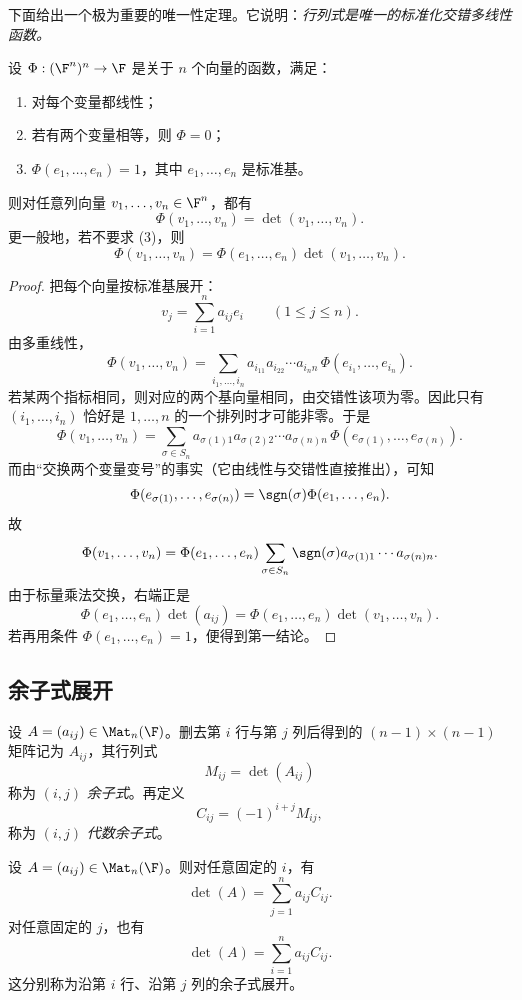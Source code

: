 下面给出一个极为重要的唯一性定理。它说明：\emph{行列式是唯一的标准化交错多线性函数。}

\begin{theorem}[行列式的刻画]
设 $\Phi:(\F^n)^n\to\F$ 是关于 $n$ 个向量的函数，满足：
\begin{enumerate}[label=(\arabic*)]
  \item 对每个变量都线性；
  \item 若有两个变量相等，则 $\Phi=0$；
  \item $\Phi(e_1,\dots,e_n)=1$，其中 $e_1,\dots,e_n$ 是标准基。
\end{enumerate}
则对任意列向量 $v_1,\dots,v_n\in\F^n$，都有
\[
\Phi(v_1,\dots,v_n)=\det(v_1,\dots,v_n).
\]
更一般地，若不要求 (3)，则
\[
\Phi(v_1,\dots,v_n)=\Phi(e_1,\dots,e_n)\det(v_1,\dots,v_n).
\]
\end{theorem}

\begin{proof}
把每个向量按标准基展开：
\[
v_j=\sum_{i=1}^n a_{ij}e_i\qquad (1\le j\le n).
\]
由多重线性，
\[
\Phi(v_1,\dots,v_n)=\sum_{i_1,\dots,i_n}a_{i_11}a_{i_22}\cdots a_{i_nn}\,\Phi(e_{i_1},\dots,e_{i_n}).
\]
若某两个指标相同，则对应的两个基向量相同，由交错性该项为零。因此只有 $(i_1,\dots,i_n)$ 恰好是 $1,\dots,n$ 的一个排列时才可能非零。于是
\[
\Phi(v_1,\dots,v_n)=\sum_{\sigma\in S_n}a_{\sigma(1)1}a_{\sigma(2)2}\cdots a_{\sigma(n)n}\,\Phi(e_{\sigma(1)},\dots,e_{\sigma(n)}).
\]
而由“交换两个变量变号”的事实（它由线性与交错性直接推出），可知
\[
\Phi(e_{\sigma(1)},\dots,e_{\sigma(n)})=\sgn(\sigma)\Phi(e_1,\dots,e_n).
\]
故
\[
\Phi(v_1,\dots,v_n)=\Phi(e_1,\dots,e_n)\sum_{\sigma\in S_n}\sgn(\sigma)a_{\sigma(1)1}\cdots a_{\sigma(n)n}.
\]
由于标量乘法交换，右端正是
\[
\Phi(e_1,\dots,e_n)\det(a_{ij})=
\Phi(e_1,\dots,e_n)\det(v_1,\dots,v_n).
\]
若再用条件 $\Phi(e_1,\dots,e_n)=1$，便得到第一结论。
\end{proof}

\subsection{余子式展开}

\begin{definition}
设 $A=(a_{ij})\in\Mat_n(\F)$。删去第 $i$ 行与第 $j$ 列后得到的 $(n-1)\times(n-1)$ 矩阵记为 $A_{ij}$，其行列式
\[
M_{ij}=\det(A_{ij})
\]
称为 $(i,j)$ \emph{余子式}。再定义
\[
C_{ij}=(-1)^{i+j}M_{ij},
\]
称为 $(i,j)$ \emph{代数余子式}。
\end{definition}

\begin{theorem}[按行按列展开]
设 $A=(a_{ij})\in\Mat_n(\F)$。则对任意固定的 $i$，有
\[
\det(A)=\sum_{j=1}^n a_{ij}C_{ij}.
\]
对任意固定的 $j$，也有
\[
\det(A)=\sum_{i=1}^n a_{ij}C_{ij}.
\]
这分别称为沿第 $i$ 行、沿第 $j$ 列的余子式展开。
\end{theorem}

